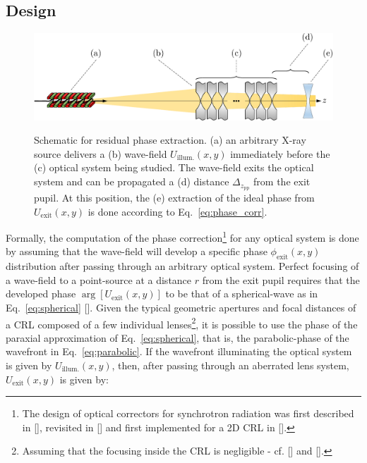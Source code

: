 \begin{refsection}
\subsection{Design}\label{sec:design}
\begin{figure}[t]
        \centering
        {\includegraphics[width=0.6\linewidth]{figures/ch06/phase_extraction.pdf}}
        \caption[Schematic for phase correction calculation]{Schematic for residual phase extraction. (a) an arbitrary X-ray source delivers a (b) wave-field $U_{\text{illum.}}(x,y)$ immediately before the (c) optical system being studied. The wave-field exits the optical system and can be propagated a (d) distance $\Delta_{z_\text{pp}}$ from the exit pupil. At this position, the (e) extraction of the ideal phase from $U_{\text{exit}}(x,y)$ is done according to Eq.~\ref{eq:phase_corr}.}\label{fig:phase_extraction}
\end{figure}
Formally, the computation of the phase correction\footnote{The design of optical correctors for synchrotron radiation was first described in [\cite[\textit{§2}]{Chubar1999}], revisited in [\cite{Chubar2001b}] and first implemented for a 2D CRL in [\cite{Seiboth2017}].} for any optical system is done by assuming that the wave-field will develop a specific phase $\phi_{\text{exit}}(x,y)$ distribution after passing through an arbitrary optical system. Perfect focusing of a wave-field to a point-source at a distance $r$ from the exit pupil requires that the developed phase $\arg [U_{\text{exit}}(x,y)]$ to be that of a spherical-wave as in Eq.~\ref{eq:spherical} [\cite{Chubar1999}]. Given the typical geometric apertures and focal distances of a CRL composed of a few individual lenses\footnote{Assuming that the focusing inside the CRL is negligible - cf. [\cite{Schroer2005}] and [\cite[\textit{\S6}]{Seiboth2018}].}, it is possible to use the phase of the paraxial approximation of Eq.~\ref{eq:spherical}, that is, the parabolic-phase of the wavefront in Eq.~\ref{eq:parabolic}. If the wavefront illuminating the optical system is given by $U_{\text{illum.}}(x,y)$, then, after passing through an aberrated lens system, $U_{\text{exit}}(x,y)$ is given by:

\end{refsection}
